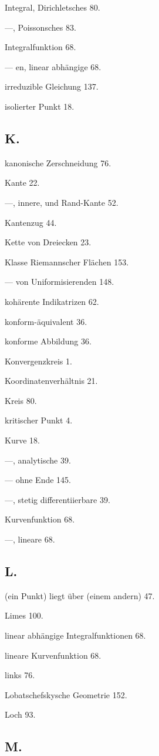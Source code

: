 \documentclass{article}
\begin{document}
Integral, Dirichletsches 80.

---, Poissonsches 83.

Integralfunktion 68.

--- en, linear abhängige 68.

irreduzible Gleichung 137.

isolierter Punkt 18.

\subsection*{K.}

kanonische Zerschneidung 76.

Kante 22.

---, innere, und Rand-Kante 52.

Kantenzug 44.

Kette von Dreiecken 23.

Klasse Riemannscher Flächen 153.

--- von Uniformisierenden 148.

kohärente Indikatrizen 62.

konform-äquivalent 36.

konforme Abbildung 36.

Konvergenzkreis 1.

Koordinatenverhältnis 21.

Kreis 80.

kritischer Punkt 4.

Kurve 18.

---, analytische 39.

--- ohne Ende 145.

---, stetig differentiierbare 39.

Kurvenfunktion 68.

---, lineare 68.

\subsection*{L.}

(ein Punkt) liegt über (einem andern) 47.

Limes 100.

linear abhängige Integralfunktionen 68.

lineare Kurvenfunktion 68.

links 76.

Lobatschefskysche Geometrie 152.

Loch 93.

\subsection*{M.}
\end{document}
